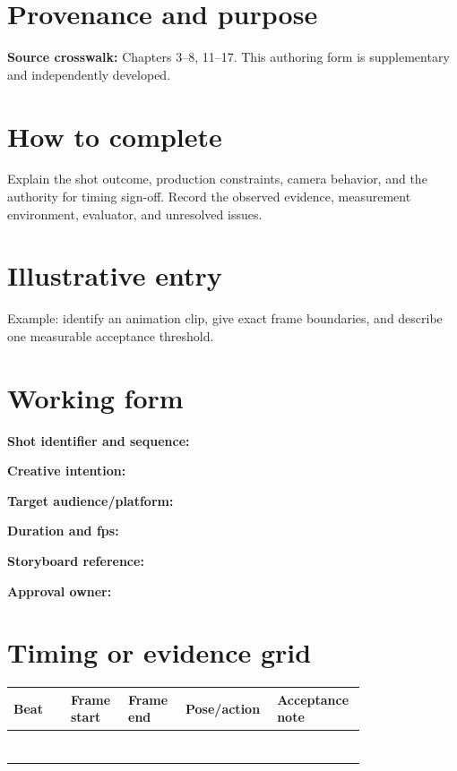 \documentclass[10pt,letterpaper]{article}
\begin{document}
\makedoctitle
\makedocsummary

\section{Provenance and purpose}
\textbf{Source crosswalk:} Chapters 3--8, 11--17. This authoring form is supplementary and independently developed.
\section{How to complete}
Explain the shot outcome, production constraints, camera behavior, and the authority for timing sign-off. Record the observed evidence, measurement environment, evaluator, and unresolved issues. 
\section{Illustrative entry}
Example: identify an animation clip, give exact frame boundaries, and describe one measurable acceptance threshold.
\section{Working form}
\noindent\textbf{Shot identifier and sequence:}\quad\hrulefill\par\vspace{10pt}
\noindent\textbf{Creative intention:}\quad\hrulefill\par\vspace{10pt}
\noindent\textbf{Target audience/platform:}\quad\hrulefill\par\vspace{10pt}
\noindent\textbf{Duration and fps:}\quad\hrulefill\par\vspace{10pt}
\noindent\textbf{Storyboard reference:}\quad\hrulefill\par\vspace{10pt}
\noindent\textbf{Approval owner:}\quad\hrulefill\par\vspace{10pt}\section{Timing or evidence grid}
\begin{longtable}{|p{0.156\linewidth}|p{0.156\linewidth}|p{0.156\linewidth}|p{0.156\linewidth}|p{0.156\linewidth}|}
\hline
\textbf{Beat} & \textbf{Frame start} & \textbf{Frame end} & \textbf{Pose/action} & \textbf{Acceptance note}\\\hline
\endhead
\rule{0pt}{20pt} &  &  &  & \\\hline
\rule{0pt}{20pt} &  &  &  & \\\hline
\rule{0pt}{20pt} &  &  &  & \\\hline
\rule{0pt}{20pt} &  &  &  & \\\hline
\rule{0pt}{20pt} &  &  &  & \\\hline
\rule{0pt}{20pt} &  &  &  & \\\hline
\rule{0pt}{20pt} &  &  &  & \\\hline
\end{longtable}
\end{document}
